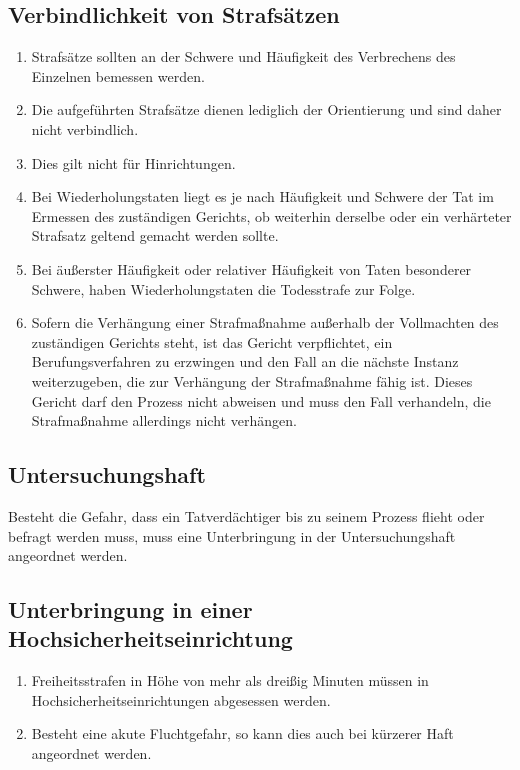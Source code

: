 \documentclass{article}
\begin{document}
\subsection{Verbindlichkeit von Strafsätzen}
\begin{enumerate}[(1)]
    \item Strafsätze sollten an der Schwere und Häufigkeit des Verbrechens des Einzelnen bemessen werden.
    \item Die aufgeführten Strafsätze dienen lediglich der Orientierung und sind daher nicht verbindlich.
    \item Dies gilt nicht für Hinrichtungen.
    \item Bei Wiederholungstaten liegt es je nach Häufigkeit und Schwere der Tat im Ermessen des zuständigen Gerichts, ob weiterhin derselbe oder ein verhärteter Strafsatz geltend gemacht werden sollte.
    \item Bei äußerster Häufigkeit oder relativer Häufigkeit von Taten besonderer Schwere, haben Wiederholungstaten die Todesstrafe zur Folge.
    \item Sofern die Verhängung einer Strafmaßnahme außerhalb der Vollmachten des zuständigen Gerichts steht, ist das Gericht verpflichtet, ein Berufungsverfahren zu erzwingen und den Fall an die nächste
    Instanz weiterzugeben, die zur Verhängung der Strafmaßnahme fähig ist. Dieses Gericht darf den Prozess nicht abweisen und muss den Fall verhandeln, die Strafmaßnahme allerdings nicht verhängen.
\end{enumerate}

\subsection{Untersuchungshaft}
Besteht die Gefahr, dass ein Tatverdächtiger bis zu seinem Prozess flieht oder befragt werden muss, muss eine Unterbringung in der Untersuchungshaft angeordnet werden.

\subsection{Unterbringung in einer Hochsicherheitseinrichtung}
\begin{enumerate}[(1)]
    \item Freiheitsstrafen in Höhe von mehr als dreißig Minuten müssen in Hochsicherheitseinrichtungen abgesessen werden.
    \item Besteht eine akute Fluchtgefahr, so kann dies auch bei kürzerer Haft angeordnet werden.
\end{enumerate}
\end{document}
